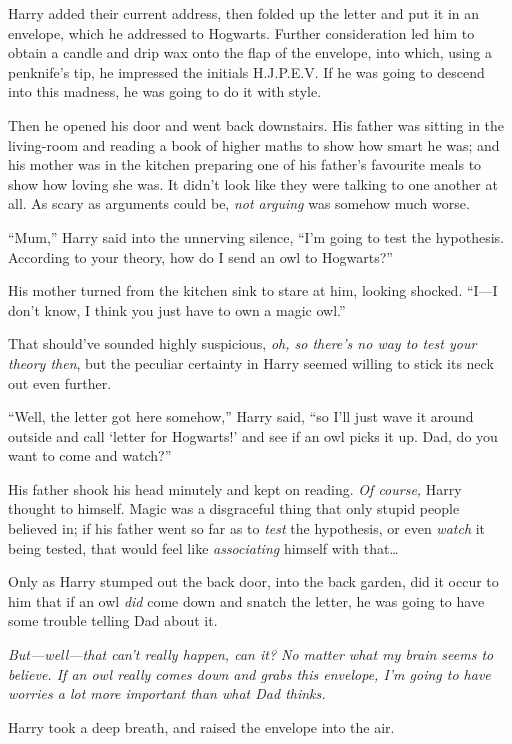 Harry added their current address, then folded up the letter and put it in an envelope, which he addressed to Hogwarts. Further consideration led him to obtain a candle and drip wax onto the flap of the envelope, into which, using a penknife’s tip, he impressed the initials H.J.P.E.V\@. If he was going to descend into this madness, he was going to do it with style.

Then he opened his door and went back downstairs. His father was sitting in the living-room and reading a book of higher maths to show how smart he was; and his mother was in the kitchen preparing one of his father’s favourite meals to show how loving she was. It didn’t look like they were talking to one another at all. As scary as arguments could be, \emph{not arguing} was somehow much worse.

“Mum,” Harry said into the unnerving silence, “I’m going to test the hypothesis. According to your theory, how do I send an owl to Hogwarts?”

His mother turned from the kitchen sink to stare at him, looking shocked. “I—I don’t know, I think you just have to own a magic owl.”

That should’ve sounded highly suspicious, \emph{oh, so there’s no way to test your theory then}, but the peculiar certainty in Harry seemed willing to stick its neck out even further.

“Well, the letter got here somehow,” Harry said, “so I’ll just wave it around outside and call ‘letter for Hogwarts!’ and see if an owl picks it up. Dad, do you want to come and watch?”

His father shook his head minutely and kept on reading. \emph{Of course,} Harry thought to himself. Magic was a disgraceful thing that only stupid people believed in; if his father went so far as to \emph{test} the hypothesis, or even \emph{watch} it being tested, that would feel like \emph{associating} himself with that…

Only as Harry stumped out the back door, into the back garden, did it occur to him that if an owl \emph{did} come down and snatch the letter, he was going to have some trouble telling Dad about it.

\emph{But—well—that can’t \emph{really} happen, can it? No matter what my brain seems to believe. If an owl really comes down and grabs this envelope, I’m going to have worries a lot more important than what Dad thinks.}

Harry took a deep breath, and raised the envelope into the air.

